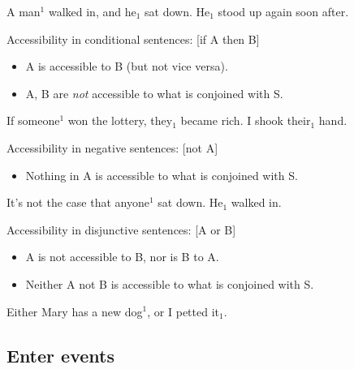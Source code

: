 \documentclass[nols,twoside,nofonts,nobib,nohyper]{tufte-handout}
\begin{document}
        \ex
        A man$^{1}$ walked in, and he$_{1}$ sat down. He$_{1}$ stood up again
        soon after.
        \xe


    Accessibility in conditional sentences: [if A then B]

    \begin{itemize}

        \item A is accessible to B (but not vice versa).

        \item A, B are \textit{not} accessible to what is conjoined with S.

    \end{itemize}

            \ex
        \ljudge{\#}If someone$^{1}$ won the lottery, they$_{1}$ became rich. I
        shook their$_{1}$ hand.
        \xe


    Accessibility in negative sentences: [not A]

    \begin{itemize}

        \item Nothing in A is accessible to what is conjoined with S.

    \end{itemize}

            \ex
        \ljudge{*}It's not the case that anyone$^{1}$ sat down. He$_{1}$ walked in.
        \xe

    Accessibility in disjunctive sentences: [A or B]

    \begin{itemize}

        \item A is not accessible to B, nor is B to A.

        \item Neither A not B is accessible to what is conjoined with S.

    \end{itemize}

            \ex
        \ljudge{\#}Either Mary has a new dog$^{1}$, or I petted it$_{1}$.
        \xe


\subsection{Enter events}
\end{document}
